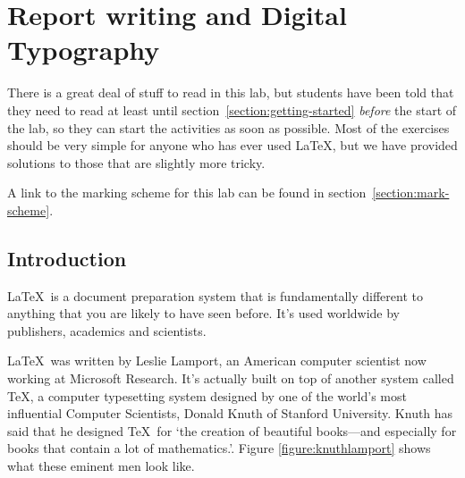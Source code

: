 



% 
\setlength{\parskip}{\parskipdefault}
\setlength{\parindent}{\parindentdefault}
\fancyheadoffset{0cm} %

\chapter{Report writing and Digital Typography}
\begin{refsection}
  
  \minitoc


\begin{demonote}
  There is a great deal of stuff to read in this lab, but students
  have been told that they need to read at least until
  section~\ref{section:getting-started} \emph{before} the start of the
  lab, so they can start the activities as soon as possible. Most of
  the exercises should be very simple for anyone who has ever used
  \LaTeX, but we have provided solutions to those that are slightly
  more tricky.

  A link to the  marking scheme for this lab can be found in section~\ref{section:mark-scheme}.

\end{demonote}

\section{Introduction}

\LaTeX\ is a document preparation system that is fundamentally
different to anything that you are likely to have seen before. It's
used worldwide by publishers, academics and scientists.

\LaTeX\ was written by Leslie Lamport, an American computer scientist now working at Microsoft Research.  It's actually built on top of another system called \TeX, a computer typesetting system designed by one of the world's most influential Computer Scientists, Donald Knuth of Stanford University. Knuth has said that he designed \TeX\ for `the creation of beautiful books---and especially for books that contain a lot of mathematics.'\citep{knuth1984}. Figure \ref{figure:knuthlamport} shows what these eminent men look like.


\end{refsection}
